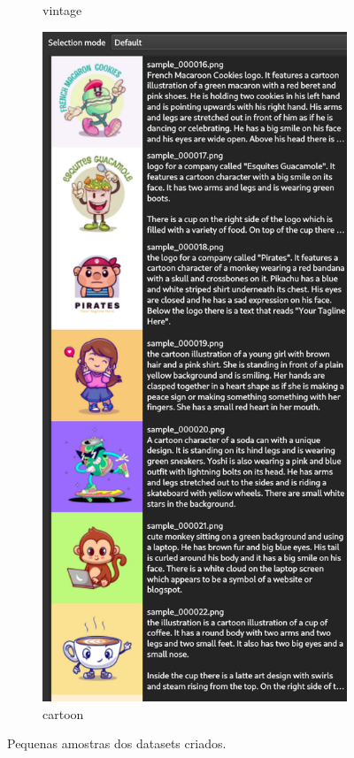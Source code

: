 \documentclass[12pt, %
openright, 
oneside, %
a4paper,    %
brazil]{facom-ufu-abntex2}
\begin{document}
\begin{figure}[H]
\begin{subfigure}{0.2\textwidth}
      \caption{vintage}
    \end{subfigure}
    \begin{subfigure}{0.2\textwidth}
      \centering
      \includegraphics[width=\linewidth]{cartoon.png}
      \caption{cartoon}
    \end{subfigure}
    \caption{Pequenas amostras dos datasets criados.}
\end{figure}
\end{document}
